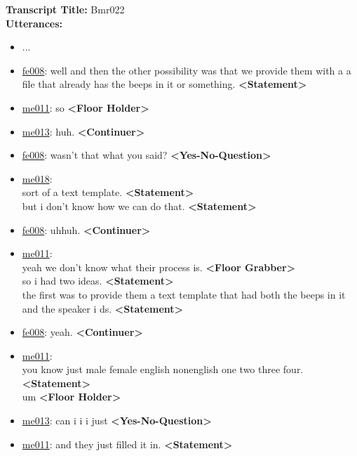 \begin{figure*}[t]
    \centering
    \begin{tcolorbox}[
      title=MRDA Example,
      colframe=blue!50!black,
      colback=blue!5!white,
      coltitle=white,
      fonttitle=\bfseries,
      boxrule=0.5mm,
      width=\textwidth,
      sharp corners%
    ]

    \textbf{Transcript Title:} Bmr022 \\

    \textbf{Utterances:}
    \begin{itemize} 
        \setlength\itemsep{0em}
        \item ...
        \item \underline{fe008}: well and then the other possibility was that we provide them with a a file that already has the beeps in it or something. \textbf{<Statement>}
        \item \underline{me011}: so \textbf{<Floor Holder>}
        \item \underline{me013}: huh. \textbf{<Continuer>}
        \item \underline{fe008}: wasn't that what you said? \textbf{<Yes-No-Question>}
        \item \underline{me018}:\\
        sort of a text template. \textbf{<Statement>}\\ 
        but i don't know how we can do that. \textbf{<Statement>}
        \item \underline{fe008}: uhhuh. \textbf{<Continuer>}
        \item \underline{me011}:\\
        yeah we don't know what their process is. \textbf{<Floor Grabber>}\\
        so i had two ideas. \textbf{<Statement>}\\
        the first was to provide them a text template that had both the beeps in it and the speaker i ds. \textbf{<Statement>}
        \item \underline{fe008}: yeah. \textbf{<Continuer>}
        \item \underline{me011}:\\
        you know just male female english nonenglish one two three four. \textbf{<Statement>}\\
        um \textbf{<Floor Holder>}
        \item \underline{me013}: can i i i just \textbf{<Yes-No-Question>}
        \item \underline{me011}: and they just filled it in. \textbf{<Statement>}

\end{itemize}
\end{tcolorbox}
\end{figure*}
